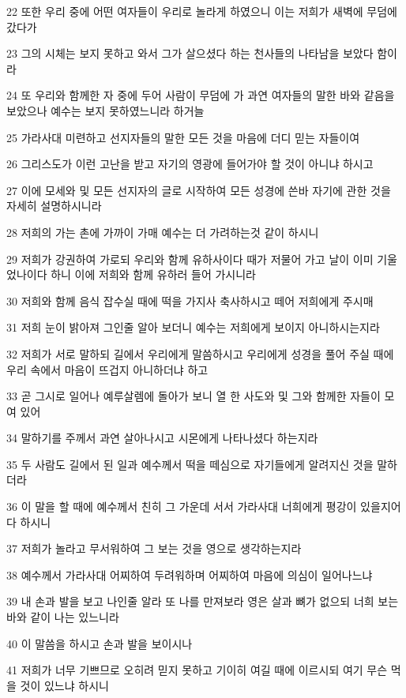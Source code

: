 \par 22 또한 우리 중에 어떤 여자들이 우리로 놀라게 하였으니 이는 저희가 새벽에 무덤에 갔다가
\par 23 그의 시체는 보지 못하고 와서 그가 살으셨다 하는 천사들의 나타남을 보았다 함이라
\par 24 또 우리와 함께한 자 중에 두어 사람이 무덤에 가 과연 여자들의 말한 바와 같음을 보았으나 예수는 보지 못하였느니라 하거늘
\par 25 가라사대 미련하고 선지자들의 말한 모든 것을 마음에 더디 믿는 자들이여
\par 26 그리스도가 이런 고난을 받고 자기의 영광에 들어가야 할 것이 아니냐 하시고
\par 27 이에 모세와 및 모든 선지자의 글로 시작하여 모든 성경에 쓴바 자기에 관한 것을 자세히 설명하시니라
\par 28 저희의 가는 촌에 가까이 가매 예수는 더 가려하는것 같이 하시니
\par 29 저희가 강권하여 가로되 우리와 함께 유하사이다 때가 저물어 가고 날이 이미 기울었나이다 하니 이에 저희와 함께 유하러 들어 가시니라
\par 30 저희와 함께 음식 잡수실 때에 떡을 가지사 축사하시고 떼어 저희에게 주시매
\par 31 저희 눈이 밝아져 그인줄 알아 보더니 예수는 저희에게 보이지 아니하시는지라
\par 32 저희가 서로 말하되 길에서 우리에게 말씀하시고 우리에게 성경을 풀어 주실 때에 우리 속에서 마음이 뜨겁지 아니하더냐 하고
\par 33 곧 그시로 일어나 예루살렘에 돌아가 보니 열 한 사도와 및 그와 함께한 자들이 모여 있어
\par 34 말하기를 주께서 과연 살아나시고 시몬에게 나타나셨다 하는지라
\par 35 두 사람도 길에서 된 일과 예수께서 떡을 떼심으로 자기들에게 알려지신 것을 말하더라
\par 36 이 말을 할 때에 예수께서 친히 그 가운데 서서 가라사대 너희에게 평강이 있을지어다 하시니
\par 37 저희가 놀라고 무서워하여 그 보는 것을 영으로 생각하는지라
\par 38 예수께서 가라사대 어찌하여 두려워하며 어찌하여 마음에 의심이 일어나느냐
\par 39 내 손과 발을 보고 나인줄 알라 또 나를 만져보라 영은 살과 뼈가 없으되 너희 보는 바와 같이 나는 있느니라
\par 40 이 말씀을 하시고 손과 발을 보이시나
\par 41 저희가 너무 기쁘므로 오히려 믿지 못하고 기이히 여길 때에 이르시되 여기 무슨 먹을 것이 있느냐 하시니
